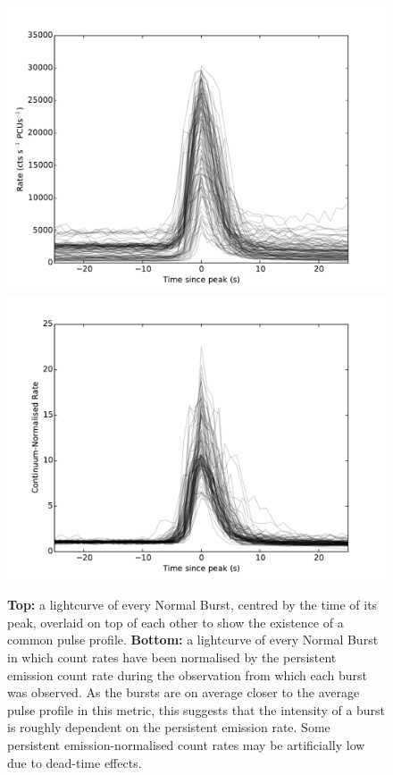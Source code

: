 \begin{figure}
  \centering
  \includegraphics[width=.9\linewidth, trim={0.4cm 0 1.1cm 0},clip]{images/1000norm.pdf}
  \includegraphics[width=.9\linewidth, trim={0.4cm 0 1.1cm 0},clip]{images/1000norm_renormed.pdf}
  \caption[A plot of every Normal Burst, centred by the time of its peak, overlaid on top of each other to show the existence of a common pulse profile.]{\small \textbf{Top:} a lightcurve of every Normal Burst, centred by the time of its peak, overlaid on top of each other to show the existence of a common pulse profile.  \textbf{Bottom:} a lightcurve of every Normal Burst in which count rates have been normalised by the persistent emission count rate during the observation from which each burst was observed.  As the bursts are on average closer to the average pulse profile in this metric, this suggests that the intensity of a burst is roughly dependent on the persistent emission rate.  Some persistent emission-normalised count rates may be artificially low due to dead-time effects.}
  \label{fig:norm_overlay}
\end{figure}

